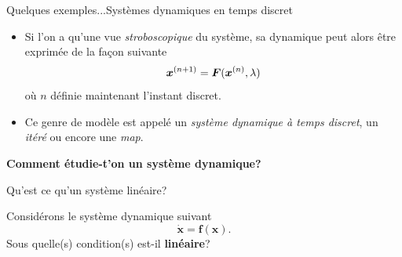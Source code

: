 \documentclass[usenames,dvipsnames,svgnames,10pt,aspectratio=169]{beamer}
\begin{document}
\begin{frame}[t, c]{Quelques exemples...}{Systèmes dynamiques en temps discret}

	\begin{itemize}
		\item Si l'on a qu'une vue \emph{stroboscopique} du système, sa dynamique peut alors être exprimée de la façon suivante
		\begin{equation}
			{\bm x}^{(n+1)} = \bm{F}({\bm x}^{(n)}, \lambda)
			\notag
		\end{equation}
		où $n$ définie maintenant l'instant discret.

		\bigskip

		\item Ce genre de modèle est appelé un \emph{système dynamique à temps discret}, un \emph{itéré} ou encore une \emph{map}.
	\end{itemize}

		\vspace{1cm}
\end{frame}



\begin{frame}[t, c]{}{}

	\centering

	{\Large \textbf{Comment étudie-t'on un système dynamique?}}

	\bigskip


	\vspace{-2cm}
\end{frame}

\begin{frame}[t, c]{Qu'est ce qu'un système linéaire?}{}
	\begin{block}{}
		\centering
		Considérons le système dynamique suivant
		$$ \dot{\bm x} = {\bm f}({\bm x}).$$
		Sous quelle(s) condition(s) est-il \alert{\textbf{linéaire}}?
	\end{block}

	\vspace{1cm}
\end{frame}
\end{document}
